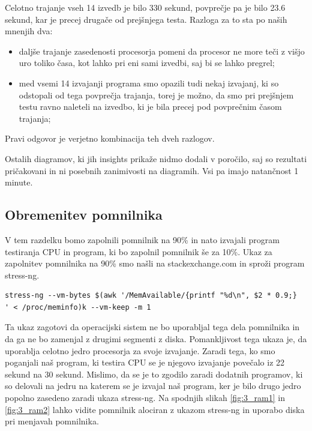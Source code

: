 Celotno trajanje vseh 14 izvedb je bilo 330 sekund, povprečje pa je bilo 23.6 sekund, kar je precej drugače od prejšnjega testa. Razloga za to sta po naših mnenjih dva:
\begin{itemize}
	\item daljše trajanje zasedenosti procesorja pomeni da procesor ne more teči z višjo uro toliko časa, kot lahko pri eni sami izvedbi, saj bi se lahko pregrel;
	\item med vsemi 14 izvajanji programa smo opazili tudi nekaj izvajanj, ki so odstopali od tega povprečja trajanja, torej je možno, da smo pri prejšnjem testu ravno naleteli na izvedbo, ki je bila precej pod povprečnim časom trajanja;
\end{itemize}
Pravi odgovor je verjetno kombinacija teh dveh razlogov.

Ostalih diagramov, ki jih insights prikaže nidmo dodali v poročilo, saj so rezultati pričakovani in ni posebnih zanimivosti na diagramih. Vsi pa imajo natančnost 1 minute.




\subsection{Obremenitev pomnilnika}

V tem razdelku bomo zapolnili pomnilnik na 90\% in nato izvajali program testiranja CPU in program, ki bo zapolnil pomnilnik še za 10\%.
Ukaz za zapolnitev pomnilnika na 90\% smo našli na stackexchange.com \cite{mem90Fill} in sproži program stress-ng.
\begin{verbatim}
stress-ng --vm-bytes $(awk '/MemAvailable/{printf "%d\n", $2 * 0.9;}
' < /proc/meminfo)k --vm-keep -m 1
\end{verbatim}
Ta ukaz zagotovi da operacijski sistem ne bo uporabljal tega dela pomnilnika in da ga ne bo zamenjal z drugimi segmenti z diska. Pomankljivost tega ukaza je, da uporablja celotno jedro procesorja za svoje izvajanje. Zaradi tega, ko smo poganjali naš program, ki testira CPU se je njegovo izvajanje povečalo iz 22 sekund na 30 sekund. Mislimo, da se je to zgodilo zaradi dodatnih programov, ki so delovali na jedru na katerem se je izvajal naš program, ker je bilo drugo jedro popolno zasedeno zaradi ukaza stress-ng. Na spodnjih slikah \ref{fig:3_ram1} in \ref{fig:3_ram2} lahko vidite pomnilnik alociran z ukazom stress-ng in uporabo diska pri menjavah pomnilnika. 


